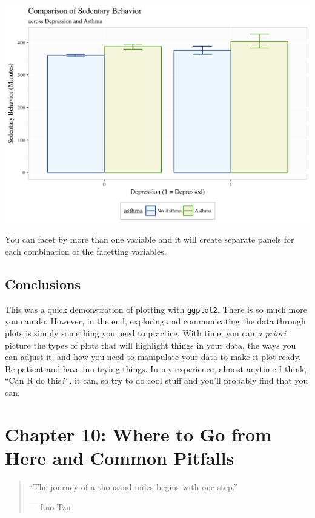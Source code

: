 \documentclass[]{tufte-book}
\theoremstyle{definition}
\theoremstyle{definition}
\theoremstyle{remark}
\begin{document}
\includegraphics{_main_files/figure-latex/unnamed-chunk-155-1}

You can facet by more than one variable and it will create separate
panels for each combination of the facetting variables.

\section*{Conclusions}\label{conclusions-5}

This was a quick demonstration of plotting with \texttt{ggplot2}. There
is so much more you can do. However, in the end, exploring and
communicating the data through plots is simply something you need to
practice. With time, you can \emph{a priori} picture the types of plots
that will highlight things in your data, the ways you can adjust it, and
how you need to manipulate your data to make it plot ready. Be patient
and have fun trying things. In my experience, almost anytime I think,
``Can R do this?'', it can, so try to do cool stuff and you'll probably
find that you can.

\chapter*{Chapter 10: Where to Go from Here and Common
Pitfalls}\label{chapter-10-where-to-go-from-here-and-common-pitfalls}

\begin{quote}
``The journey of a thousand miles begins with one step.''

--- Lao Tzu
\end{quote}
\end{document}
